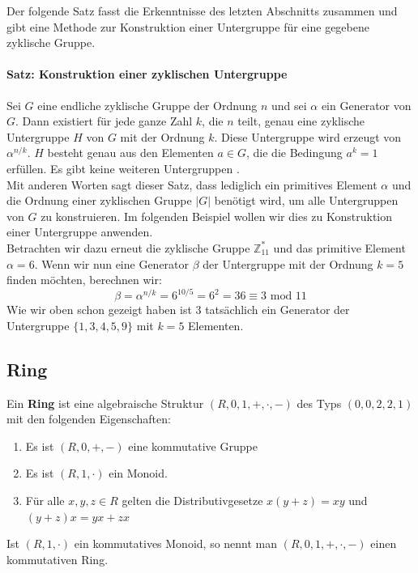 Der folgende Satz fasst die Erkenntnisse des letzten Abschnitts zusammen und gibt eine Methode zur Konstruktion einer Untergruppe für eine gegebene zyklische Gruppe.

\paragraph{Satz: Konstruktion einer zyklischen Untergruppe}
Sei $G$ eine endliche zyklische Gruppe der Ordnung $n$ und sei $\alpha$ ein Generator von $G$. Dann existiert für jede ganze Zahl $k$, die $n$ teilt, genau eine zyklische Untergruppe $H$ von $G$ mit der Ordnung $k$. Diese Untergruppe wird erzeugt von $\alpha^{n/k}$. $H$ besteht genau aus den Elementen $a \in G$, die die Bedingung $a^k = 1$ erfüllen. Es gibt keine weiteren Untergruppen \cite[S. 246]{Paar.2016}.\\

Mit anderen Worten sagt dieser Satz, dass lediglich ein primitives Element $\alpha$ und die Ordnung einer zyklischen Gruppe $|G|$ benötigt wird, um alle Untergruppen von $G$ zu konstruieren. Im folgenden Beispiel wollen wir dies zu Konstruktion einer Untergruppe anwenden.\\

Betrachten wir dazu erneut die zyklische Gruppe $\mathbb{Z}^*_{11}$ und das primitive Element $\alpha = 6$. Wenn wir nun eine Generator $\beta$ der Untergruppe mit der Ordnung $k = 5$ finden möchten, berechnen wir:
$$\beta = \alpha^{n/k} = 6^{10/5} = 6^2 = 36 \equiv 3 \text{ mod } 11$$
Wie wir oben schon gezeigt haben ist $3$ tatsächlich ein Generator der Untergruppe $\{1,3,4,5,9\}$ mit $k = 5$ Elementen\cite[S. 246]{Paar.2016}.

\subsection{Ring}
Ein \textbf{Ring} ist eine algebraische Struktur $(R,0,1,+,\cdot,-)$ des Typs $(0,0,2,2,1)$ mit den folgenden Eigenschaften:
\begin{enumerate}
\item Es ist $(R,0,+,-)$ eine kommutative Gruppe
\item Es ist $(R,1,\cdot)$ ein Monoid.
\item Für alle $x,y,z \in R$ gelten die Distributivgesetze $x(y+z) = xy$ und $(y+z)x = yx +zx$
\end{enumerate}
Ist $(R,1,\cdot)$ ein kommutatives Monoid, so nennt man $(R,0,1,+,\cdot,-)$ einen kommutativen Ring.

